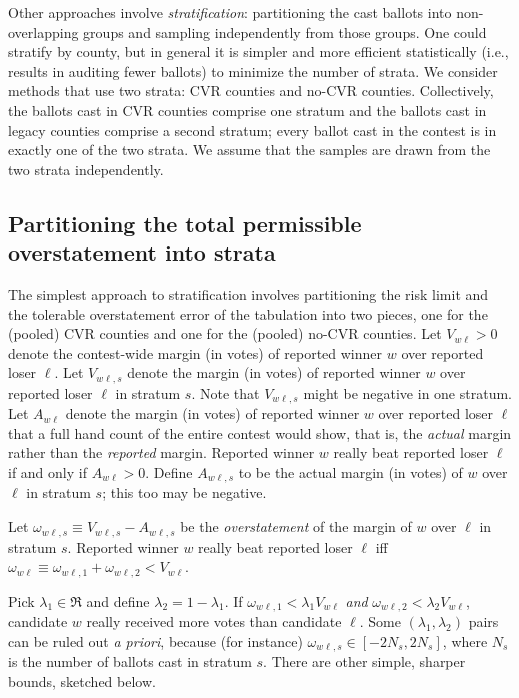 \documentclass[12pt]{article}
\begin{document}
Other approaches involve \emph{stratification}: partitioning the cast ballots
into non-overlapping groups and sampling independently from those groups.
One could stratify by county, but in general it is simpler and more efficient
statistically (i.e., results in auditing fewer ballots) to minimize the number of strata.
We consider methods that use two strata: CVR counties and no-CVR counties. 
Collectively, the ballots cast in CVR counties comprise one stratum and the ballots cast in 
legacy counties comprise a second stratum; every ballot cast in the contest is in 
exactly one of the two strata. 
We assume that the samples are drawn from the
two strata independently.

\subsection{Partitioning the total permissible overstatement into strata}
The simplest approach to stratification involves partitioning the risk limit and the tolerable
overstatement error of the tabulation into
two pieces, one for the (pooled) CVR counties and one for the (pooled) no-CVR counties.
Let $V_{w\ell} > 0$ denote the contest-wide margin (in votes) of reported winner 
$w$ over reported loser
$\ell$.
Let $V_{w\ell,s}$ denote the margin (in votes) of reported winner $w$ over reported loser $\ell$
in stratum $s$. 
Note that $V_{w\ell,s}$ might be negative in one stratum.
Let $A_{w\ell}$ denote the margin (in votes)
of reported winner $w$ over reported loser $\ell$ that 
a full hand count of the entire contest would show, that is, the \emph{actual} margin rather
than the \emph{reported} margin.
Reported winner $w$ really beat reported loser $\ell$ if and only if $A_{w\ell} > 0$.
Define $A_{w\ell,s}$ to be the actual margin (in votes) of $w$ over $\ell$ in stratum $s$;
this too may be negative.

Let $\omega_{w\ell,s} \equiv V_{w\ell,s} - A_{w\ell,s}$ be the \emph{overstatement}
of the margin of $w$ over $\ell$ in stratum $s$.
Reported winner $w$ really beat reported loser 
$\ell$ iff $\omega_{w\ell} \equiv \omega_{w\ell,1} + \omega_{w\ell,2} < V_{w\ell}$.

Pick $\lambda_1 \in \Re$ and define $\lambda_2 = 1-\lambda_1$.
If $\omega_{w\ell,1} < \lambda_1 V_{w\ell}$ \emph{and} 
$\omega_{w\ell,2} < \lambda_2 V_{w\ell}$, candidate $w$ really received more votes
than candidate $\ell$.
Some $(\lambda_1, \lambda_2)$ pairs 
can be ruled out \emph{a priori}, because (for instance) $\omega_{w\ell,s} \in [-2N_s, 2N_s]$,
where $N_s$ is the number of ballots cast in stratum $s$.
There are other simple, sharper bounds, sketched below.
\end{document}
